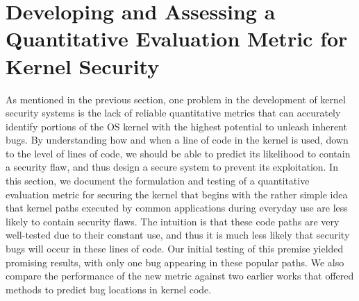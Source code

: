 \section{Developing and Assessing a Quantitative Evaluation Metric for Kernel Security}
\label{sec.metric}
As mentioned in the previous section, one problem in the development of kernel
security systems is the lack of reliable quantitative metrics that
can accurately identify portions of the OS kernel with the highest potential
to unleash inherent bugs. By understanding how and when
a line of code in the kernel is used, down to the level of lines of code, we
should be able to predict its likelihood to contain a security flaw, and thus
design a secure system to prevent its exploitation.
In this section, we document the formulation and testing
of a quantitative evaluation metric for securing the kernel that begins with the
rather simple idea that kernel paths executed by common applications
during everyday use are less likely to contain security flaws. The intuition
is that these code paths are very well-tested due to their constant use, and
thus it is much less likely that security bugs will occur in these lines of code.
Our initial testing of this premise yielded promising results, with only one
bug appearing in these popular paths.  We also compare the performance of the
new metric against two earlier works that offered methods to predict bug
locations in kernel code.







